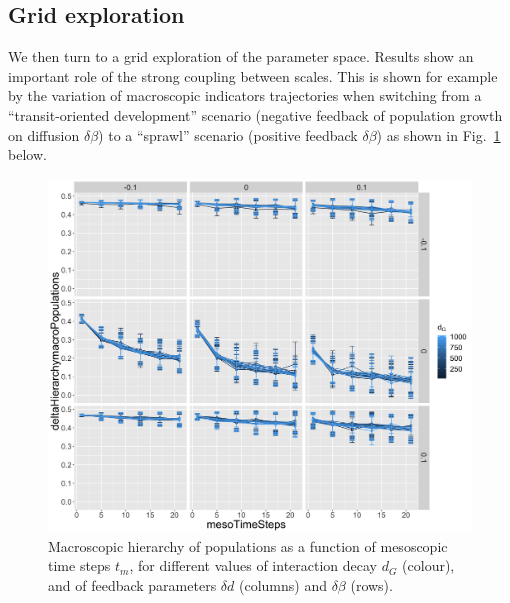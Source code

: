 \documentclass[ijgi,article,submit,moreauthors,pdftex]{Definitions/mdpi}
\begin{document}
\subsection{Grid exploration}




We then turn to a grid exploration of the parameter space. %
Results show an important role of the strong coupling between scales. This is shown for example by the variation of macroscopic indicators trajectories when switching from a ``transit-oriented development'' scenario (negative feedback of population growth on diffusion $\delta \beta$) to a ``sprawl'' scenario (positive feedback $\delta \beta$) as shown in Fig.~\ref{fig:fig4} below.

\begin{figure}[H]
	\includegraphics[width=\linewidth]{figures/deltaHierarchymacroPopulations-mesoTimeSteps_colorMacroInteractionDecay_facetmesoMacroDecayUpdateMax-macroMesoBetaUpdateMax.png}
	\caption{Macroscopic hierarchy of populations as a function of mesoscopic time steps $t_m$, for different values of interaction decay $d_G$ (colour), and of feedback parameters $\delta d$ (columns) and $\delta \beta$ (rows).\label{fig:fig4}}
\end{figure}
\end{document}

